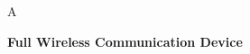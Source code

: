 \documentclass[12pt,brazil]{article}
\begin{document}






\begin{phantom}
A \vspace{6cm}
\end{phantom}

\begin{center}
    \Huge \textbf{Full Wireless Communication Device}\vspace{8cm}
\end{center} 

\begin{center}
      \vspace{4cm}
\end{center} 

\begin{center}
\end{center} 

\begin{center}
     \\ 
\end{center} 






   







\justifying
\newpage
\tableofcontents %

\clearpage %




\end{document}
